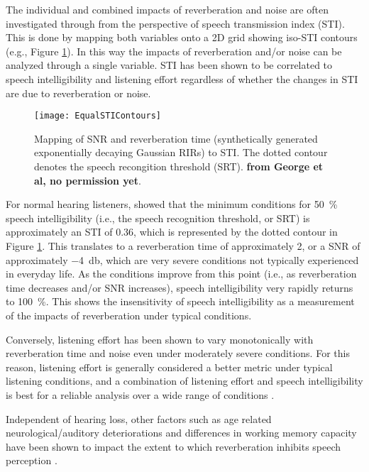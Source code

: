 The individual and combined impacts of reverberation and noise are often investigated through from the perspective of speech transmission index (STI). This is done by mapping both variables onto a 2D grid showing iso-STI contours (e.g., Figure \ref{fig:equal_sti_contours}). In this way the impacts of reverberation and/or noise can be analyzed through a single variable. STI has been shown to be correlated to speech intelligibility and listening effort regardless of whether the changes in STI are due to reverberation or noise.

\begin{figure}[H]
	\centering
	\texttt{[image: EqualSTIContours]}
	\caption[Mapping of SNR/T60 to STI]{Mapping of SNR and reverberation time (synthetically generated exponentially decaying Gaussian RIRs) to STI. The dotted contour denotes the speech recongition threshold (SRT). \textbf{from George et al, no permission yet}.}
	\label{fig:equal_sti_contours}
\end{figure}

For normal hearing listeners, \cite{george2010measuring} showed that the minimum conditions for \qty{50}{\percent} speech intelligibility (i.e., the speech recognition threshold, or SRT) is approximately an STI of 0.36, which is represented by the dotted contour in Figure \ref{fig:equal_sti_contours}. This translates to a reverberation time of approximately \qty{2}{\sec}, or a SNR of approximately \qty{-4}{\decibel}, which are very severe conditions not typically experienced in everyday life. As the conditions improve from this point (i.e., as reverberation time decreases and/or SNR increases), speech intelligibility very rapidly returns to \qty{100}{\percent}. This shows the insensitivity of speech intelligibility as a measurement of the impacts of reverberation under typical conditions.

Conversely, listening effort has been shown to vary monotonically with reverberation time and noise even under moderately severe conditions. For this reason, listening effort is generally considered a better metric under typical listening conditions, and a combination of listening effort and speech intelligibility is best for a reliable analysis over a wide range of conditions \citep{schepker2016perceived}.

Independent of hearing loss, other factors such as age related neurological/auditory deteriorations and differences in working memory capacity have been shown to impact the extent to which reverberation inhibits speech perception \citep{reinhart2018listener}.

